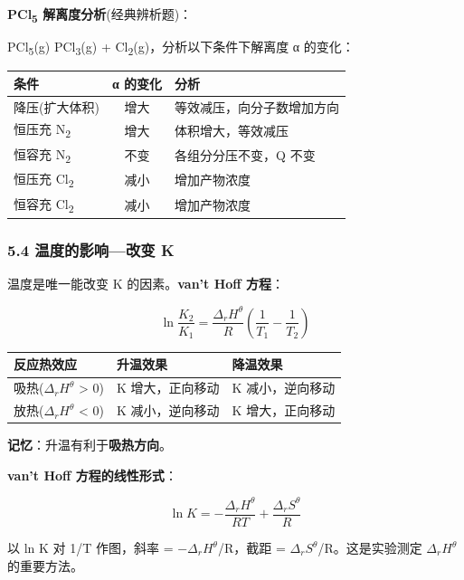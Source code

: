 \textbf{PCl\textsubscript{5} 解离度分析}(经典辨析题)：

PCl\textsubscript{5}(g) \衡 PCl\textsubscript{3}(g) + Cl\textsubscript{2}(g)，分析以下条件下解离度 α 的变化：

{\def\LTcaptype{none} %
\begin{longtable}[]{@{}lcl@{}}
\toprule\noalign{}
条件 & α 的变化 & 分析 \\
\midrule\noalign{}
\endhead
\bottomrule\noalign{}
\endlastfoot
降压(扩大体积) & 增大 & 等效减压，向分子数增加方向 \\
恒压充 N\textsubscript{2} & 增大 & 体积增大，等效减压 \\
恒容充 N\textsubscript{2} & 不变 & 各组分分压不变，Q 不变 \\
恒压充 Cl\textsubscript{2} & 减小 & 增加产物浓度 \\
恒容充 Cl\textsubscript{2} & 减小 & 增加产物浓度 \\
\end{longtable}
}

\subsubsection{5.4 温度的影响---改变 K}\label{ux6e29ux5ea6ux7684ux5f71ux54cdux6539ux53d8-k}

温度是唯一能改变 K 的因素。\textbf{van't Hoff 方程}：

\[
\boxed{\ln\frac{K_2}{K_1} = \frac{\Delta_r H^\theta}{R}\left(\frac{1}{T_1} - \frac{1}{T_2}\right)}
\]

{\def\LTcaptype{none} %
\begin{longtable}[]{@{}lll@{}}
\toprule\noalign{}
反应热效应 & 升温效果 & 降温效果 \\
\midrule\noalign{}
\endhead
\bottomrule\noalign{}
\endlastfoot
吸热(\(\Delta_r H^\theta\) \textgreater{} 0) & K 增大，正向移动 & K 减小，逆向移动 \\
放热(\(\Delta_r H^\theta\) \textless{} 0) & K 减小，逆向移动 & K 增大，正向移动 \\
\end{longtable}
}

\textbf{记忆}：升温有利于\textbf{吸热方向}。

\textbf{van't Hoff 方程的线性形式}：

\[
\ln K = -\frac{\Delta_r H^\theta}{RT} + \frac{\Delta_r S^\theta}{R}
\]

以 ln K 对 1/T 作图，斜率 = −\(\Delta_r H^\theta\)/R，截距 = \(\Delta_r S^\theta\)/R。这是实验测定 \(\Delta_r H^\theta\) 的重要方法。

